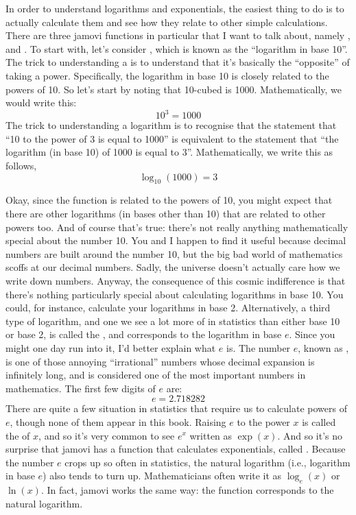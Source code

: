 In order to understand logarithms and exponentials, the easiest thing to do is to actually calculate them and see how they relate to other simple calculations. There are three jamovi functions in particular that I want to talk about, namely ,  and . To start with, let's consider , which is known as the ``logarithm in base 10''. The trick to understanding a  is to understand that it's basically the ``opposite'' of taking a power. Specifically, the logarithm in base 10 is closely related to the powers of 10. So let's start by noting that 10-cubed is 1000. Mathematically, we would write this:
$$ 
10^3 = 1000
$$
The trick to understanding a logarithm is to recognise that the statement that ``10 to the power of 3 is equal to 1000'' is equivalent to the statement that ``the logarithm (in base 10) of 1000 is equal to 3''. Mathematically, we write this as follows,
$$
\log_{10}( 1000 ) = 3
$$

Okay, since the  function is related to the powers of 10, you might expect that there are other logarithms (in bases other than 10) that are related to other powers too. And of course that's true: there's not really anything mathematically special about the number 10. You and I happen to find it useful because decimal numbers are built around the number 10, but the big bad world of mathematics scoffs at our decimal numbers. Sadly, the universe doesn't actually care how we write down numbers. Anyway, the consequence of this cosmic indifference is that there's nothing particularly special about calculating logarithms in base 10. You could, for instance, calculate your logarithms in base 2. Alternatively, a third type of logarithm, and one we see a lot more of in statistics than either base 10 or base 2, is called the , and corresponds to the logarithm in base $e$. Since you might one day run into it, I'd better explain what $e$ is. The number $e$, known as , is one of those annoying ``irrational'' numbers whose decimal expansion is infinitely long, and is considered one of the most important numbers in mathematics. The first few digits of $e$ are:
$$
e = 2.718282 
$$ 
There are quite a few situation in statistics that require us to calculate powers of $e$, though none of them appear in this book. Raising $e$ to the power $x$ is called the  of $x$, and so it's very common to see $e^x$ written as $\exp(x)$. And so it's no surprise that jamovi has a function that calculates exponentials, called . Because the number $e$ crops up so often in statistics, the natural logarithm (i.e., logarithm in base $e$) also tends to turn up. Mathematicians often write it as $\log_e(x)$ or $\ln(x)$. In fact, jamovi works the same way: the  function corresponds to the natural logarithm.

